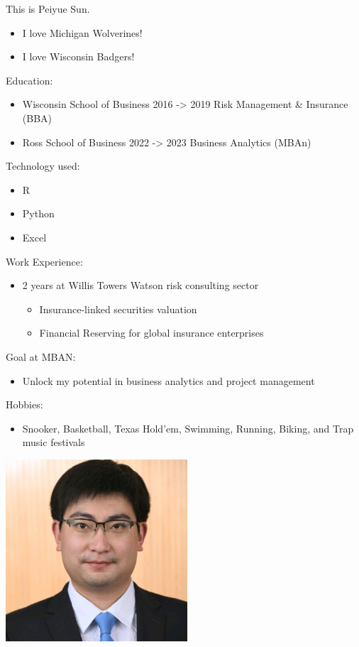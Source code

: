 \documentclass[
]{book}
\providecommand{\tightlist}{%
  \setlength{\itemsep}{0pt}\setlength{\parskip}{0pt}}
\theoremstyle{definition}
\theoremstyle{definition}
\theoremstyle{definition}
\theoremstyle{definition}
\theoremstyle{remark}
\begin{document}
This is Peiyue Sun.

\begin{itemize}
\tightlist
\item
  I love Michigan Wolverines!
\item
  I love Wisconsin Badgers!
\end{itemize}

Education:

\begin{itemize}
\tightlist
\item
  Wisconsin School of Business 2016 -\textgreater{} 2019 Risk Management \& Insurance (BBA)
\item
  Ross School of Business 2022 -\textgreater{} 2023 Business Analytics (MBAn)
\end{itemize}

Technology used:

\begin{itemize}
\tightlist
\item
  R
\item
  Python
\item
  Excel
\end{itemize}

Work Experience:

\begin{itemize}
\tightlist
\item
  2 years at Willis Towers Watson risk consulting sector

  \begin{itemize}
  \tightlist
  \item
    Insurance-linked securities valuation
  \item
    Financial Reserving for global insurance enterprises
  \end{itemize}
\end{itemize}

Goal at MBAN:

\begin{itemize}
\tightlist
\item
  Unlock my potential in business analytics and project management
\end{itemize}

Hobbies:

\begin{itemize}
\tightlist
\item
  Snooker, Basketball, Texas Hold'em, Swimming, Running, Biking, and Trap music festivals
\end{itemize}

\includegraphics[width=2.66667in,height=\textheight]{1.jpg}
\end{document}
